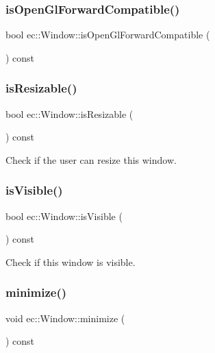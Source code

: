 \subsubsection{\texorpdfstring{is\+Open\+Gl\+Forward\+Compatible()}{isOpenGlForwardCompatible()}}
{\footnotesize\ttfamily bool ec\+::\+Window\+::is\+Open\+Gl\+Forward\+Compatible (\begin{DoxyParamCaption}{ }\end{DoxyParamCaption}) const}

\mbox{\label{classec_1_1_window_a8af5e954522cc427ab1fe5b6a28f5328}} 
\subsubsection{\texorpdfstring{is\+Resizable()}{isResizable()}}
{\footnotesize\ttfamily bool ec\+::\+Window\+::is\+Resizable (\begin{DoxyParamCaption}{ }\end{DoxyParamCaption}) const}

Check if the user can resize this window. \mbox{\label{classec_1_1_window_a0f4ab1e221cbf5ce5b5a1183a51e38cd}} 
\subsubsection{\texorpdfstring{is\+Visible()}{isVisible()}}
{\footnotesize\ttfamily bool ec\+::\+Window\+::is\+Visible (\begin{DoxyParamCaption}{ }\end{DoxyParamCaption}) const}

Check if this window is visible. \mbox{\label{classec_1_1_window_a03862c4545b0ad415438f4b8c26849ef}} 
\subsubsection{\texorpdfstring{minimize()}{minimize()}}
{\footnotesize\ttfamily void ec\+::\+Window\+::minimize (\begin{DoxyParamCaption}{ }\end{DoxyParamCaption}) const}

